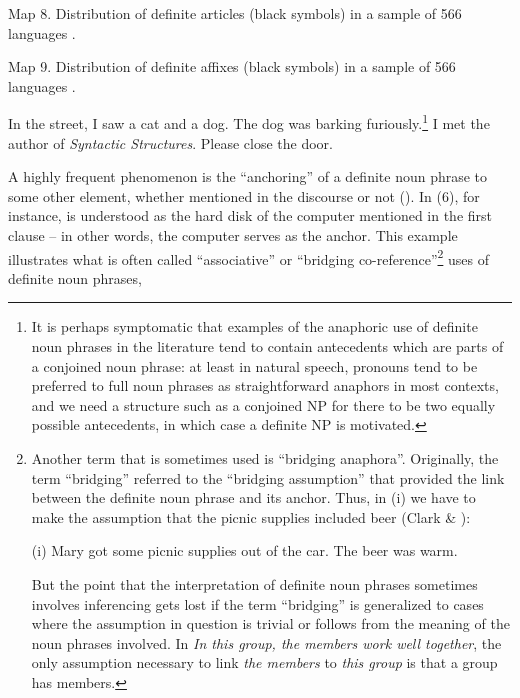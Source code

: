 \label{bkm:Ref130721880}Map 8. Distribution of definite articles (black symbols) in a sample of 566 languages \citep{Dryer2005}.


Map 9. Distribution of definite affixes (black symbols) in a sample of 566 languages \citep{Dryer2005}.



\ea 
	\gl	\label{bkm:Ref93745057}In the street, I saw a cat and a dog. The dog was barking furiously.\footnote{ It is perhaps symptomatic that examples of the anaphoric use of definite noun phrases in the literature tend to contain antecedents which are parts of a conjoined noun phrase: at least in natural speech, pronouns tend to be preferred to full noun phrases as straightforward anaphors in most contexts, and we need a structure such as a conjoined NP for there to be two equally possible antecedents, in which case a definite NP is motivated.}
\z 
\ea 
	\gl	\label{bkm:Ref93745078}I met the author of \textit{Syntactic Structures}.
\z 
\ea 
	\gl \label{bkm:Ref93745091}Please close the door. 
\z 

A highly frequent phenomenon is the “anchoring” of a definite noun phrase to some other element, whether mentioned in the discourse or not (\citet[25]{Fraurud1992}). In (6), for instance,  is understood as the hard disk of the computer mentioned in the first clause – in other words, the computer serves as the anchor.  This example illustrates what is often called “associative” or “bridging co-reference”\footnote{ Another term that is sometimes used is “bridging anaphora”. Originally, the term “bridging” referred to the “bridging assumption” that provided the link between the definite noun phrase and its anchor. Thus, in (i) we have to make the assumption that the picnic supplies included beer (Clark \& \citet{Haviland1974}):\par (i) Mary got some picnic supplies out of the car. The beer was warm. \par But the point that the interpretation of definite noun phrases sometimes involves inferencing gets lost if the term “bridging” is generalized to cases where the assumption in question is trivial or follows from the meaning of the noun phrases involved. In \textit{In this group, the members work well together}, the only assumption necessary to link \textit{the members} to \textit{this group} is that a group has members. } uses of definite noun phrases,

